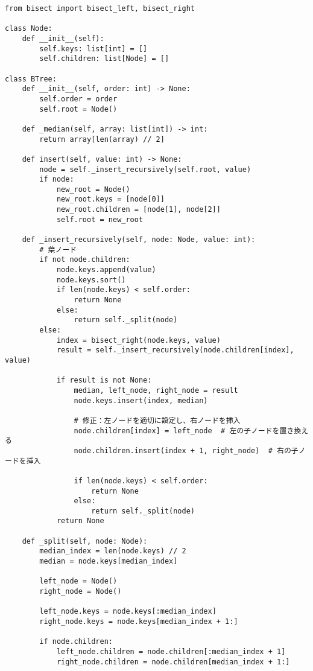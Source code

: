 \begin{lstlisting}[caption=B木の実装, label=btree, frame=TRBL, label={btree}]
from bisect import bisect_left, bisect_right

class Node:
    def __init__(self):
        self.keys: list[int] = []
        self.children: list[Node] = []

class BTree:
    def __init__(self, order: int) -> None:
        self.order = order
        self.root = Node()
    
    def _median(self, array: list[int]) -> int:
        return array[len(array) // 2]

    def insert(self, value: int) -> None:
        node = self._insert_recursively(self.root, value)
        if node:
            new_root = Node()
            new_root.keys = [node[0]]
            new_root.children = [node[1], node[2]]
            self.root = new_root
    
    def _insert_recursively(self, node: Node, value: int):
        # 葉ノード
        if not node.children:
            node.keys.append(value)
            node.keys.sort()
            if len(node.keys) < self.order:
                return None 
            else:
                return self._split(node)
        else:  
            index = bisect_right(node.keys, value)
            result = self._insert_recursively(node.children[index], value)
            
            if result is not None:
                median, left_node, right_node = result
                node.keys.insert(index, median)
                
                # 修正：左ノードを適切に設定し、右ノードを挿入
                node.children[index] = left_node  # 左の子ノードを置き換える
                node.children.insert(index + 1, right_node)  # 右の子ノードを挿入

                if len(node.keys) < self.order:
                    return None
                else:
                    return self._split(node) 
            return None

    def _split(self, node: Node):
        median_index = len(node.keys) // 2
        median = node.keys[median_index]

        left_node = Node()
        right_node = Node()

        left_node.keys = node.keys[:median_index]
        right_node.keys = node.keys[median_index + 1:]

        if node.children:
            left_node.children = node.children[:median_index + 1]
            right_node.children = node.children[median_index + 1:]


\end{lstlisting}
